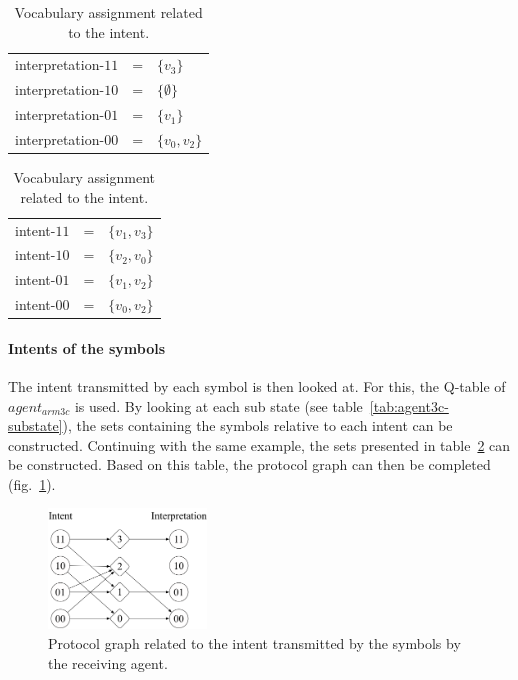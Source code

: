 \begin{table}[H]
\centering
\begin{minipage}[b]{.5\textwidth}
\vspace{0pt}
    \centering
    \begin{tabular}{lll}
    interpretation-$11$ & = & $\{v_3\}$ \\
    interpretation-$10$ & = & $\{\emptyset\}$ \\
    interpretation-$01$ & = & $\{v_1\}$\\
    interpretation-$00$ & = & $\{v_0, v_2\}$\\
    \end{tabular}
    \caption{Vocabulary assignment related to the interpretation.}
    \label{tab:grounding-set-inter}
\end{minipage}%
\begin{minipage}[b]{.50\textwidth}
    \vspace{0pt}
    \centering
    \begin{tabular}{lll}
    intent-$11$ & = & $\{v_1, v_3\}$ \\
    intent-$10$ & = & $\{v_2, v_0\}$ \\
    intent-$01$ & = & $\{v_1, v_2\}$\\
    intent-$00$ & = & $\{v_0, v_2\}$\\
    \end{tabular}
    \caption{Vocabulary assignment related to the intent.}
    \label{tab:grounding-set-intent}
\end{minipage}
\end{table}


\paragraph*{Intents of the symbols}
The intent transmitted by each symbol is then looked at. For this, the Q-table of $agent_{arm3c}$ is used. By looking at each sub state (see table~\ref{tab:agent3c-substate}), the sets containing the symbols relative to each intent can be constructed. Continuing with the same example, the sets presented in table~\ref{tab:grounding-set-intent} can be constructed. Based on this table, the protocol graph can then be completed (fig.~\ref{fig:grounding-intent}).

\begin{figure}[H]
    \vspace{0pt}
    \centering
    \includegraphics[width=0.375\textwidth]{imgs/grounding-intent.png}
    \caption[Protocol graph related to the intent of the symbols]{Protocol graph related to the intent transmitted by the symbols by the receiving agent.}
    \label{fig:grounding-intent}
\end{figure}

